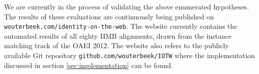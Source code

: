 \documentclass[letterpaper]{article}
\newcommand{\pair}[2]{\langle#1,#2\rangle}
\newcommand{\set}[1]{\{#1\}}
\begin{document}
We are currently in the process of validating the above enumerated hypotheses.
The results of these evaluations are continuously being published on
  \verb|wouterbeek.com/identity-on-the-web|.
The website currently contains the automated results of all eighty IIMB
  alignments, drawn from the instance matching track of the
  OAEI 2012.
The website also refers to the publicly available Git repository
  \verb|github.com/wouterbeek/IOTW| where the implementation
  discussed in section \ref{sec:implementation} can be found.

\end{document}
